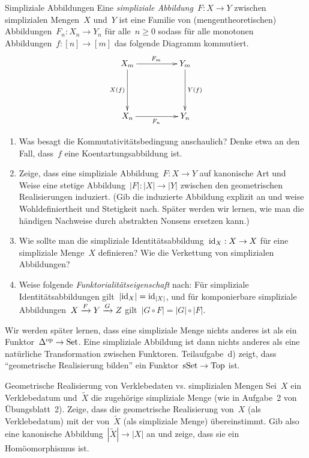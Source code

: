 \documentclass{uebblatt}
\begin{document}

\begin{aufgabe}{Simpliziale Abbildungen}
Eine \emph{simpliziale Abbildung}~$F : X \to Y$ zwischen simplizialen
Mengen~$X$ und~$Y$ ist eine Familie von (mengentheoretischen) Abbildungen~$F_n
: X_n \to Y_n$ für alle~$n \geq 0$ sodass für alle monotonen Abbildungen~$f :
[n] \to [m]$ das folgende Diagramm kommutiert.
\[ \xymatrixcolsep{4pc}\xymatrixrowsep{4pc}\xymatrix{
  X_m \ar[r]^{F_m} \ar[d]_{X(f)} & Y_m \ar[d]^{Y(f)} \\
  X_n \ar[r]_{F_n} & Y_n
} \]

\begin{enumerate}
\item Was besagt die Kommutativitätsbedingung anschaulich? Denke etwa an den
Fall, dass~$f$ eine Koentartungsabbildung ist.
\item Zeige, dass eine simpliziale Abbildung~$F : X \to Y$ auf kanonische Art
und Weise eine stetige Abbildung~$|F| : |X| \to |Y|$ zwischen den geometrischen
Realisierungen induziert. (Gib die induzierte Abbildung explizit an und weise
Wohldefiniertheit und Stetigkeit nach. Später werden wir lernen, wie man die
händigen Nachweise durch abstrakten Nonsens ersetzen kann.)
\item Wie sollte man die simpliziale Identitätsabbildung~$\mathrm{id}_X : X \to X$ für
eine simpliziale Menge~$X$ definieren? Wie die Verkettung von simplizialen
Abbildungen?
\item Weise folgende \emph{Funktorialitätseigenschaft} nach: Für
simpliziale Identitätsabbildungen gilt~$|\mathrm{id}_X| = \mathrm{id}_{|X|}$, und für
komponierbare simpliziale Abbildungen~$X \xrightarrow{F} Y \xrightarrow{G} Z$ gilt~$|G \circ F|
= |G| \circ |F|$.
\end{enumerate}

{\tiny
Wir werden später lernen, dass eine simpliziale Menge nichts anderes ist als
ein Funktor~$\Delta^{\mathrm{op}} \to \mathrm{Set}$. Eine simpliziale Abbildung ist dann nichts
anderes als eine natürliche Transformation zwischen Funktoren. Teilaufgabe~d)
zeigt, dass "`geometrische Realisierung bilden"' ein Funktor~$\mathrm{sSet} \to \mathrm{Top}$
ist.\par}
\end{aufgabe}

\begin{aufgabe}{Geometrische Realisierung von Verklebedaten vs. simplizialen Mengen}
Sei~$X$ ein Verklebedatum und~$\widetilde X$ die zugehörige simpliziale Menge
(wie in Aufgabe~2 von Übungsblatt~2). Zeige, dass die geometrische
Realisierung von~$X$ (als Verklebedatum) mit der von~$\widetilde X$ (als
simpliziale Menge) übereinstimmt. Gib also eine kanonische
Abbildung~$|\widetilde X| \to |X|$ an und zeige, dass sie ein Homöomorphismus
ist.
\end{aufgabe}
\end{document}
